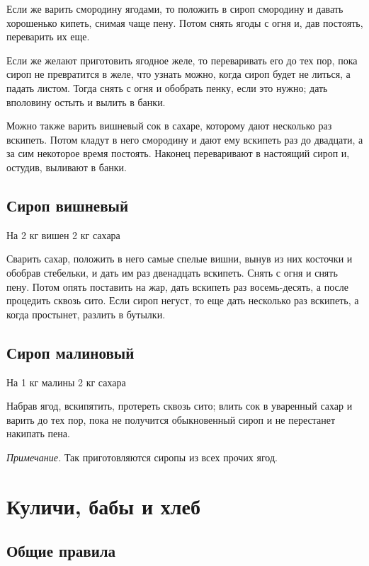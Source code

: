 Если же варить смородину ягодами, то положить в сироп смородину и давать хорошенько кипеть, снимая чаще пену. Потом снять ягоды с огня и, дав постоять, переварить их еще.

Если же желают приготовить ягодное желе, то переваривать его до тех пор, пока сироп не превратится в желе, что узнать можно, когда сироп будет не литься, а падать листом. Тогда снять с огня и обобрать пенку, если это нужно; дать вполовину остыть и вылить в банки.

Можно также варить вишневый сок в сахаре, которому дают несколько раз вскипеть. Потом кладут в него смородину и дают ему вскипеть раз до двадцати, а за сим некоторое время постоять. Наконец переваривают в настоящий сироп и, остудив, выливают в банки.

\subsection{Сироп вишневый}

На 2 кг вишен 2 кг сахара

Сварить сахар, положить в него самые спелые вишни, вынув из них косточки и обобрав стебельки, и дать им раз двенадцать вскипеть. Снять с огня и снять пену. Потом опять поставить на жар, дать вскипеть раз восемь-десять, а после процедить сквозь сито. Если сироп негуст, то еще дать несколько раз вскипеть, а когда простынет, разлить в бутылки.

\subsection{Сироп малиновый}

На 1 кг малины 2 кг сахара

Набрав ягод, вскипятить, протереть сквозь сито; влить сок в уваренный сахар и варить до тех пор, пока не получится обыкновенный сироп и не перестанет накипать пена.

\emph{Примечание.} Так приготовляются сиропы из всех прочих ягод.

\newpage
\section{Куличи, бабы и хлеб}

\subsection*{Общие правила} \label{sec:obschie-hleb}

